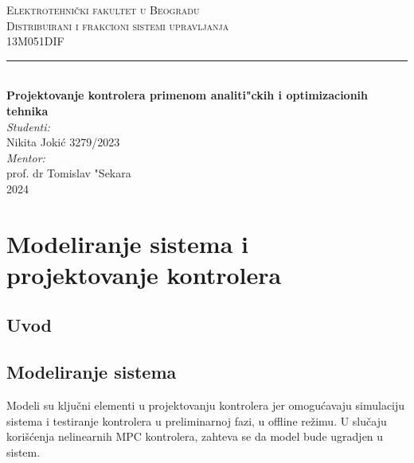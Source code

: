 \documentclass[a4paper,11pt]{article}
\theoremstyle{definition} \newtheorem{deff}{Definicija}[section]
\theoremstyle{definition} \newtheorem{prim}[deff]{Primer}
\theoremstyle{plain} \newtheorem{teor}[deff]{Teorema}
\begin{document}
	
	\begin{titlepage}
		
		\newcommand{\HRule}{\rule{\linewidth}{0.5mm}} 							%
		\center 
		
		\textsc{\LARGE Elektrotehnički fakultet u Beogradu}\\[1cm]
		
		\textsc{\Large Distribuirani i frakcioni sistemi upravljanja}\\[0.2cm]
		\textsc{\large 13M051DIF}\\[1cm] 										
		\HRule \\[0.8cm]
		{ \huge \bfseries Projektovanje kontrolera primenom analiti"ckih i optimizacionih tehnika }\\[0.7cm]								%
		
		
		\large
		\vfill 
		\emph{Studenti:}\\
		Nikita Jokić 3279/2023\\[0.1cm]
		\emph{Mentor:}\\
		prof. dr Tomislav "Sekara\\[0.1cm]									
		{\large 2024}\\[2cm]
	\end{titlepage}
	\tableofcontents
	\newpage
	
	\section{Modeliranje sistema i projektovanje kontrolera}\label{sec:mod i an}
	\subsection{Uvod} 
	
	
	
	\newpage
	
	\subsection{Modeliranje sistema}\label{sec:modeliranje}
	
	Modeli su ključni elementi u projektovanju kontrolera jer omogućavaju simulaciju sistema i testiranje kontrolera u preliminarnoj fazi, u offline režimu. U slučaju korišćenja nelinearnih MPC kontrolera, zahteva se da model bude ugradjen u sistem.  \\
	
\end{document}
